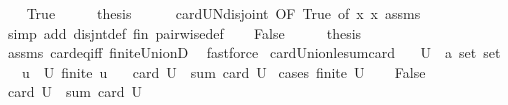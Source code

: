 \begin{isabellebody}
\ \ \isamarkupfalse%
\ True\isanewline
\ \ \isamarkupfalse%
\ \isamarkupfalse%
\ {\isacharquery}{\kern0pt}thesis\isanewline
\ \ \ \ \isamarkupfalse%
\ card{\isacharunderscore}{\kern0pt}UN{\isacharunderscore}{\kern0pt}disjoint\ {\isacharbrackleft}{\kern0pt}OF\ True{\isacharcomma}{\kern0pt}\ of\ {\isachardoublequoteopen}{\isasymlambda}x{\isachardot}{\kern0pt}\ x{\isachardoublequoteclose}{\isacharbrackright}{\kern0pt}\ assms\isanewline
\ \ \ \ \isamarkupfalse%
\ {\isacharparenleft}{\kern0pt}simp\ add{\isacharcolon}{\kern0pt}\ disjnt{\isacharunderscore}{\kern0pt}def\ fin\ pairwise{\isacharunderscore}{\kern0pt}def{\isacharparenright}{\kern0pt}\isanewline
{}\isamarkupfalse%
\isanewline
\ \ \isamarkupfalse%
\ False\isanewline
\ \ \isamarkupfalse%
\ \isamarkupfalse%
\ {\isacharquery}{\kern0pt}thesis\isanewline
\ \ \ \ \isamarkupfalse%
\ assms\ card{\isacharunderscore}{\kern0pt}eq{\isacharunderscore}{\kern0pt}{}{\isacharunderscore}{\kern0pt}iff\ finite{\isacharunderscore}{\kern0pt}UnionD\ \isamarkupfalse%
\ fastforce\isanewline
{}\isamarkupfalse%
%
\endisatagproof
{\isafoldproof}%
%
\isadelimproof
\isanewline
%
\endisadelimproof
\isanewline
{}\isamarkupfalse%
\ card{\isacharunderscore}{\kern0pt}Union{\isacharunderscore}{\kern0pt}le{\isacharunderscore}{\kern0pt}sum{\isacharunderscore}{\kern0pt}card{\isacharcolon}{\kern0pt}\isanewline
\ \ \ U\ {\isacharcolon}{\kern0pt}{\isacharcolon}{\kern0pt}\ {\isachardoublequoteopen}{\isacharprime}{\kern0pt}a\ set\ set{\isachardoublequoteclose}\isanewline
\ \ \ {\isachardoublequoteopen}{\isasymforall}u\ {\isasymin}\ U{\isachardot}{\kern0pt}\ finite\ u{\isachardoublequoteclose}\isanewline
\ \ \ {\isachardoublequoteopen}card\ {\isacharparenleft}{\kern0pt}{\isasymUnion}U{\isacharparenright}{\kern0pt}\ {\isasymle}\ sum\ card\ U{\isachardoublequoteclose}\isanewline
%
\isadelimproof
%
\endisadelimproof
%
\isatagproof
{}\isamarkupfalse%
\ {\isacharparenleft}{\kern0pt}cases\ {\isachardoublequoteopen}finite\ U{\isachardoublequoteclose}{\isacharparenright}{\kern0pt}\isanewline
\ \ \isamarkupfalse%
\ False\isanewline
\ \ \isamarkupfalse%
\ \isamarkupfalse%
\ {\isachardoublequoteopen}card\ {\isacharparenleft}{\kern0pt}{\isasymUnion}U{\isacharparenright}{\kern0pt}\ {\isasymle}\ sum\ card\ U{\isachardoublequoteclose}\isanewline

\end{isabellebody}
